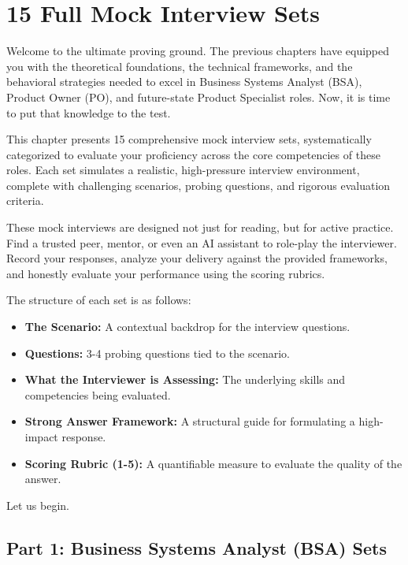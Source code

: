 \chapter{15 Full Mock Interview Sets}\label{full-mock-interview-sets}

Welcome to the ultimate proving ground. The previous chapters have
equipped you with the theoretical foundations, the technical frameworks,
and the behavioral strategies needed to excel in Business Systems
Analyst (BSA), Product Owner (PO), and future-state Product Specialist
roles. Now, it is time to put that knowledge to the test.

This chapter presents 15 comprehensive mock interview sets,
systematically categorized to evaluate your proficiency across the core
competencies of these roles. Each set simulates a realistic,
high-pressure interview environment, complete with challenging
scenarios, probing questions, and rigorous evaluation criteria.

These mock interviews are designed not just for reading, but for active
practice. Find a trusted peer, mentor, or even an AI assistant to
role-play the interviewer. Record your responses, analyze your delivery
against the provided frameworks, and honestly evaluate your performance
using the scoring rubrics.

The structure of each set is as follows:

\begin{itemize}
\tightlist
\item
  \textbf{The Scenario:} A contextual backdrop for the interview
  questions.
\item
  \textbf{Questions:} 3-4 probing questions tied to the scenario.
\item
  \textbf{What the Interviewer is Assessing:} The underlying skills and
  competencies being evaluated.
\item
  \textbf{Strong Answer Framework:} A structural guide for formulating a
  high-impact response.
\item
  \textbf{Scoring Rubric (1-5):} A quantifiable measure to evaluate the
  quality of the answer.
\end{itemize}

Let us begin.

\bigskip

\section{Part 1: Business Systems Analyst (BSA)
Sets}\label{part-1-business-systems-analyst-bsa-sets}

